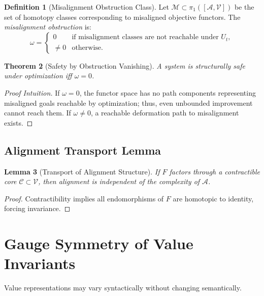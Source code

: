 \documentclass[11pt,a4paper]{article}
\theoremstyle{plain}
\newtheorem{theorem}{Theorem}[section]
\newtheorem{lemma}[theorem]{Lemma}
\theoremstyle{definition}
\newtheorem{definition}[theorem]{Definition}
\theoremstyle{remark}
\numberwithin{equation}{section}
\begin{document}
\begin{definition}[Misalignment Obstruction Class]
Let $\mathcal{M} \subset \pi_1([\mathcal{A}, \mathcal{V}])$ be the set of homotopy classes corresponding to misaligned objective functors. The \emph{misalignment obstruction} is:
\[
\omega = 
\begin{cases}
0 & \text{if misalignment classes are not reachable under } U_t,\\
\neq 0 & \text{otherwise.}
\end{cases}
\]
\end{definition}

\begin{theorem}[Safety by Obstruction Vanishing]
A system is structurally safe under optimization iff $\omega = 0$.
\end{theorem}

\begin{proof}[Proof Intuition]
If $\omega = 0$, the functor space has no path components representing misaligned goals reachable by optimization; thus, even unbounded improvement cannot reach them. If $\omega \neq 0$, a reachable deformation path to misalignment exists.
\end{proof}

\subsection{Alignment Transport Lemma}

\begin{lemma}[Transport of Alignment Structure]
If $F$ factors through a contractible core $\mathcal{C} \subset \mathcal{V}$, then alignment is independent of the complexity of $\mathcal{A}$.
\end{lemma}

\begin{proof}
Contractibility implies all endomorphisms of $F$ are homotopic to identity, forcing invariance.
\end{proof}

\section{Gauge Symmetry of Value Invariants}

Value representations may vary syntactically without changing semantically.
\end{document}
